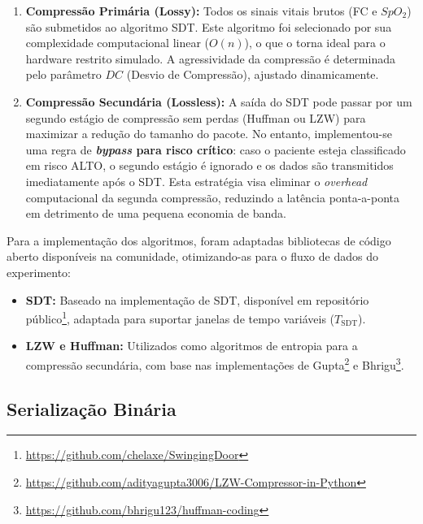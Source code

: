 \documentclass[twoside,english,brazilian]{UNISINOSmonografia}
\begin{document}
\begin{enumerate}
    \item \textbf{Compressão Primária (Lossy):} Todos os sinais vitais brutos (FC e $SpO_2$) são submetidos ao algoritmo SDT. Este algoritmo foi selecionado por sua complexidade computacional linear ($O(n)$), o que o torna ideal para o hardware restrito simulado. A agressividade da compressão é determinada pelo parâmetro $DC$ (Desvio de Compressão), ajustado dinamicamente.
    
    \item \textbf{Compressão Secundária (Lossless):} A saída do SDT pode passar por um segundo estágio de compressão sem perdas (Huffman ou LZW) para maximizar a redução do tamanho do pacote. No entanto, implementou-se uma regra de \textbf{\textit{bypass} para risco crítico}: caso o paciente esteja classificado em risco ALTO, o segundo estágio é ignorado e os dados são transmitidos imediatamente após o SDT. Esta estratégia visa eliminar o \textit{overhead} computacional da segunda compressão, reduzindo a latência ponta-a-ponta em detrimento de uma pequena economia de banda.
\end{enumerate}

Para a implementação dos algoritmos, foram adaptadas bibliotecas de código aberto disponíveis na comunidade, otimizando-as para o fluxo de dados do experimento:
\begin{itemize}
    \item \textbf{SDT:} Baseado na implementação de SDT, disponível em repositório público\footnote{\url{https://github.com/chelaxe/SwingingDoor}}, adaptada para suportar janelas de tempo variáveis ($T_{\text{SDT}}$).
    \item \textbf{LZW e Huffman:} Utilizados como algoritmos de entropia para a compressão secundária, com base nas implementações de Gupta\footnote{\url{https://github.com/adityagupta3006/LZW-Compressor-in-Python}} e Bhrigu\footnote{\url{https://github.com/bhrigu123/huffman-coding}}.
\end{itemize}

\subsection{Serialização Binária}
\label{sec:serializacao}
\end{document}
